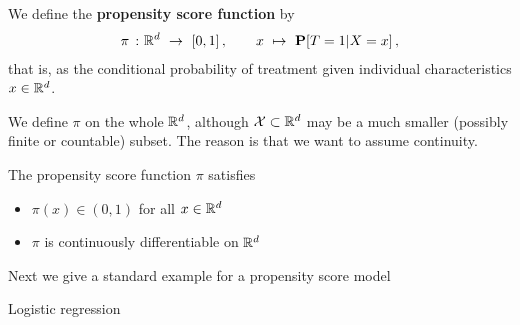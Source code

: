 \begin{definition}
  We define the \textbf{propensity score function} by
  \begin{gather*}
    \pi
    \ 
    \colon
    \R^d
    \ 
    \to
    \ 
    [0,1]
    \,,
    \qquad
    x
    \ 
    \mapsto
    \ 
    \P
    [
    T=1
    |
    X=x
    ]
    \,,
  \end{gather*}
  that is, 
  as the conditional probability of treatment given individual characteristics $x\in\mathbb{R}^d$.
\end{definition}
\begin{remark}
  We define $\pi$ on the whole $\mathbb{R}^d$, although $\mathcal{X}\subset \mathbb{R}^d$ may be a much smaller (possibly finite or countable) subset.
  The reason is that we want to assume continuity.
\end{remark}
\begin{assumption}
  \label{asu:ps}
  The propensity score function $\pi$ satisfies
  \begin{itemize}
    \item
      $\pi(x)\in (0,1)$ for all $x\in\mathbb{R}^d$
    \item
      $\pi$ is continuously differentiable on $\mathbb{R}^d$
  \end{itemize}
\end{assumption}

Next we give a standard example for a propensity score model

\begin{example}
  Logistic regression
\end{example}
